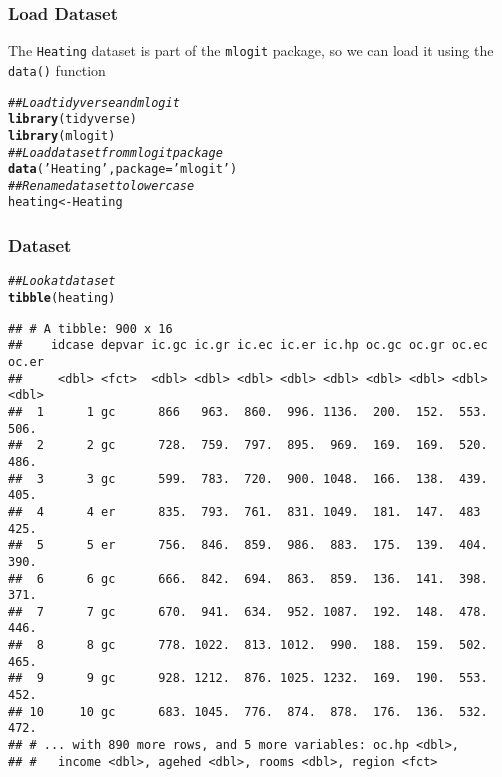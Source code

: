 \documentclass{beamer}\usepackage[]{graphicx}\usepackage[]{xcolor}
\makeatletter
\newcommand{\hlstr}[1]{\textcolor[rgb]{0.192,0.494,0.8}{#1}}%
\newcommand{\hlcom}[1]{\textcolor[rgb]{0.678,0.584,0.686}{\textit{#1}}}%
\newcommand{\hlstd}[1]{\textcolor[rgb]{0.345,0.345,0.345}{#1}}%
\newcommand{\hlkwb}[1]{\textcolor[rgb]{0.69,0.353,0.396}{#1}}%
\newcommand{\hlkwc}[1]{\textcolor[rgb]{0.333,0.667,0.333}{#1}}%
\newcommand{\hlkwd}[1]{\textcolor[rgb]{0.737,0.353,0.396}{\textbf{#1}}}%
\newenvironment{kframe}{%
 \def\at@end@of@kframe{}%
 \ifinner\ifhmode%
  \def\at@end@of@kframe{\end{minipage}}%
  \begin{minipage}{\columnwidth}%
 \fi\fi%
 \def\FrameCommand##1{\hskip\@totalleftmargin \hskip-\fboxsep
 \colorbox{shadecolor}{##1}\hskip-\fboxsep
     \hskip-\linewidth \hskip-\@totalleftmargin \hskip\columnwidth}%
 \MakeFramed {\advance\hsize-\width
   \@totalleftmargin\z@ \linewidth\hsize
   \@setminipage}}%
 {\par\unskip\endMakeFramed%
 \at@end@of@kframe}
\newenvironment{knitrout}{}{} %
\makeatother
\begin{document}
\begin{frame}[fragile]\frametitle{Load Dataset}
    The \texttt{Heating} dataset is part of the \texttt{mlogit} package, so we can load it using the \texttt{data()} function \\
\begin{knitrout}\footnotesize
{}\color{fgcolor}\begin{kframe}
\begin{alltt}
\hlcom{## Load tidyverse and mlogit}
\hlkwd{library}\hlstd{(tidyverse)}
\hlkwd{library}\hlstd{(mlogit)}
\hlcom{## Load dataset from mlogit package}
\hlkwd{data}\hlstd{(}\hlstr{'Heating'}\hlstd{,} \hlkwc{package} \hlstd{=} \hlstr{'mlogit'}\hlstd{)}
\hlcom{## Rename dataset to lowercase}
\hlstd{heating} \hlkwb{<-} \hlstd{Heating}
\end{alltt}
\end{kframe}
\end{knitrout}
\end{frame}

\begin{frame}[fragile]\frametitle{Dataset}
\begin{knitrout}\footnotesize
{}\color{fgcolor}\begin{kframe}
\begin{alltt}
\hlcom{## Look at dataset}
\hlkwd{tibble}\hlstd{(heating)}
\end{alltt}
\begin{verbatim}
## # A tibble: 900 x 16
##    idcase depvar ic.gc ic.gr ic.ec ic.er ic.hp oc.gc oc.gr oc.ec oc.er
##     <dbl> <fct>  <dbl> <dbl> <dbl> <dbl> <dbl> <dbl> <dbl> <dbl> <dbl>
##  1      1 gc      866   963.  860.  996. 1136.  200.  152.  553.  506.
##  2      2 gc      728.  759.  797.  895.  969.  169.  169.  520.  486.
##  3      3 gc      599.  783.  720.  900. 1048.  166.  138.  439.  405.
##  4      4 er      835.  793.  761.  831. 1049.  181.  147.  483   425.
##  5      5 er      756.  846.  859.  986.  883.  175.  139.  404.  390.
##  6      6 gc      666.  842.  694.  863.  859.  136.  141.  398.  371.
##  7      7 gc      670.  941.  634.  952. 1087.  192.  148.  478.  446.
##  8      8 gc      778. 1022.  813. 1012.  990.  188.  159.  502.  465.
##  9      9 gc      928. 1212.  876. 1025. 1232.  169.  190.  553.  452.
## 10     10 gc      683. 1045.  776.  874.  878.  176.  136.  532.  472.
## # ... with 890 more rows, and 5 more variables: oc.hp <dbl>,
## #   income <dbl>, agehed <dbl>, rooms <dbl>, region <fct>
\end{verbatim}
\end{kframe}
\end{knitrout}
\end{frame}
\end{document}
